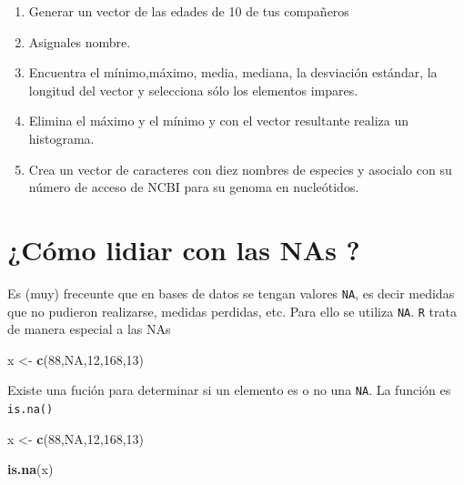 \documentclass[
]{book}
\newenvironment{Shaded}{\begin{snugshade}}{\end{snugshade}}
\newcommand{\ConstantTok}[1]{\textcolor[rgb]{0.56,0.35,0.01}{#1}}
\newcommand{\DecValTok}[1]{\textcolor[rgb]{0.00,0.00,0.81}{#1}}
\newcommand{\FunctionTok}[1]{\textcolor[rgb]{0.13,0.29,0.53}{\textbf{#1}}}
\newcommand{\NormalTok}[1]{#1}
\newcommand{\OtherTok}[1]{\textcolor[rgb]{0.56,0.35,0.01}{#1}}
\providecommand{\tightlist}{%
  \setlength{\itemsep}{0pt}\setlength{\parskip}{0pt}}
\begin{document}
\begin{enumerate}
\def\labelenumi{\arabic{enumi}.}
\tightlist
\item
  Generar un vector de las edades de 10 de tus compañeros
\item
  Asignales nombre.
\item
  Encuentra el mínimo,máximo, media, mediana, la desviación estándar, la longitud del vector y selecciona sólo los elementos impares.
\item
  Elimina el máximo y el mínimo y con el vector resultante realiza un histograma.
\item
  Crea un vector de caracteres con diez nombres de especies y asocialo con su número de acceso de NCBI para su genoma en nucleótidos.
\end{enumerate}

\section{¿Cómo lidiar con las NAs ?}\label{cuxf3mo-lidiar-con-las-nas}

Es (muy) freceunte que en bases de datos se tengan valores \texttt{NA}, es decir medidas que no pudieron realizarse, medidas perdidas, etc. Para ello se utiliza \texttt{NA}.
\texttt{R} trata de manera especial a las NAs

\begin{Shaded}
\begin{Highlighting}[]
\NormalTok{x }\OtherTok{\textless{}{-}} \FunctionTok{c}\NormalTok{(}\DecValTok{88}\NormalTok{,}\ConstantTok{NA}\NormalTok{,}\DecValTok{12}\NormalTok{,}\DecValTok{168}\NormalTok{,}\DecValTok{13}\NormalTok{)}
\end{Highlighting}
\end{Shaded}

Existe una fución para determinar si un elemento es o no una \texttt{NA}. La función es \texttt{is.na()}

\begin{Shaded}
\begin{Highlighting}[]
\NormalTok{x }\OtherTok{\textless{}{-}} \FunctionTok{c}\NormalTok{(}\DecValTok{88}\NormalTok{,}\ConstantTok{NA}\NormalTok{,}\DecValTok{12}\NormalTok{,}\DecValTok{168}\NormalTok{,}\DecValTok{13}\NormalTok{)}
\end{Highlighting}
\end{Shaded}

\begin{Shaded}
\begin{Highlighting}[]
\FunctionTok{is.na}\NormalTok{(x)}
\end{Highlighting}
\end{Shaded}
\end{document}
